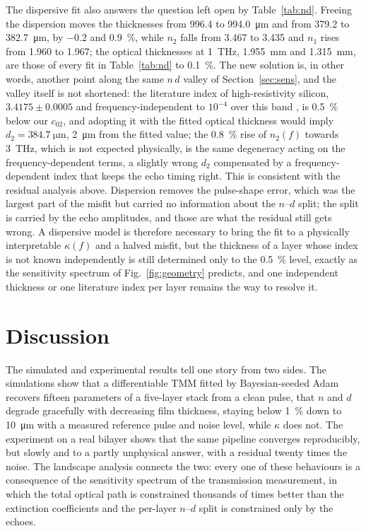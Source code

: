 \documentclass{optica-article}
\newcommand{\kap}{\kappa}
\begin{document}
The dispersive fit also answers the question left open by Table~\ref{tab:nd}. Freeing the dispersion moves the thicknesses from 996.4 to \SI{994.0}{\micro\metre} and from 379.2 to \SI{382.7}{\micro\metre}, by $-0.2$ and \SI{+0.9}{\percent}, while $n_2$ falls from 3.467 to 3.435 and $n_1$ rises from 1.960 to 1.967; the optical thicknesses at \SI{1}{THz}, \SI{1.955}{\milli\metre} and \SI{1.315}{\milli\metre}, are those of every fit in Table~\ref{tab:nd} to \SI{0.1}{\percent}. The new solution is, in other words, another point along the same $n\,d$ valley of Section~\ref{sec:sens}, and the valley itself is not shortened: the literature index of high-resistivity silicon, $3.4175\pm0.0005$ and frequency-independent to $10^{-4}$ over this band \cite{Dai2004}, is \SI{0.5}{\percent} below our $c_{02}$, and adopting it with the fitted optical thickness would imply $d_2=\SI{384.7}{\micro\metre}$, \SI{2}{\micro\metre} from the fitted value; the \SI{0.8}{\percent} rise of $n_2(f)$ towards \SI{3}{THz}, which is not expected physically, is the same degeneracy acting on the frequency-dependent terms, a slightly wrong $d_2$ compensated by a frequency-dependent index that keeps the echo timing right. This is consistent with the residual analysis above. Dispersion removes the pulse-shape error, which was the largest part of the misfit but carried no information about the $n$--$d$ split; the split is carried by the echo amplitudes, and those are what the residual still gets wrong. A dispersive model is therefore necessary to bring the fit to a physically interpretable $\kap(f)$ and a halved misfit, but the thickness of a layer whose index is not known independently is still determined only to the \SI{0.5}{\percent} level, exactly as the sensitivity spectrum of Fig.~\ref{fig:geometry} predicts, and one independent thickness or one literature index per layer remains the way to resolve it.

\section{Discussion}\label{sec:discussion}
The simulated and experimental results tell one story from two sides. The simulations show that a differentiable TMM fitted by Bayesian-seeded Adam recovers fifteen parameters of a five-layer stack from a clean pulse, that $n$ and $d$ degrade gracefully with decreasing film thickness, staying below \SI{1}{\percent} down to \SI{10}{\micro\metre} with a measured reference pulse and noise level, while $\kap$ does not. The experiment on a real bilayer shows that the same pipeline converges reproducibly, but slowly and to a partly unphysical answer, with a residual twenty times the noise. The landscape analysis connects the two: every one of these behaviours is a consequence of the sensitivity spectrum of the transmission measurement, in which the total optical path is constrained thousands of times better than the extinction coefficients and the per-layer $n$--$d$ split is constrained only by the echoes.
\end{document}
